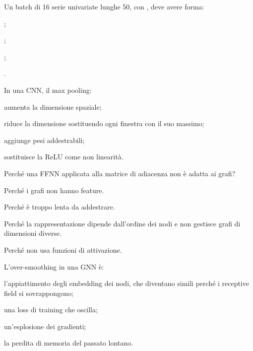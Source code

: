 \begin{domanda}\label{quiz:m27}
Un batch di 16 serie univariate lunghe 50, con , deve avere forma:
\begin{opzioni}
  \item {};
  \item {};
  \item {};
  \item {}.
\end{opzioni}
\end{domanda}

\begin{domanda}[CNN]\label{quiz:m28}
In una CNN, il max pooling:
\begin{opzioni}
  \item aumenta la dimensione spaziale;
  \item riduce la dimensione sostituendo ogni finestra con il suo massimo;
  \item aggiunge pesi addestrabili;
  \item sostituisce la ReLU come non linearità.
\end{opzioni}
\end{domanda}

\begin{domanda}[GNN]\label{quiz:m29}
Perché una FFNN applicata alla matrice di adiacenza non è adatta ai grafi?
\begin{opzioni}
  \item Perché i grafi non hanno feature.
  \item Perché è troppo lenta da addestrare.
  \item Perché la rappresentazione dipende dall'ordine dei nodi e non gestisce grafi di dimensioni diverse.
  \item Perché non usa funzioni di attivazione.
\end{opzioni}
\end{domanda}

\begin{domanda}[GNN]\label{quiz:m30}
L'over-smoothing in una GNN è:
\begin{opzioni}
  \item l'appiattimento degli embedding dei nodi, che diventano simili perché i receptive field si sovrappongono;
  \item una loss di training che oscilla;
  \item un'esplosione dei gradienti;
  \item la perdita di memoria del passato lontano.
\end{opzioni}
\end{domanda}

